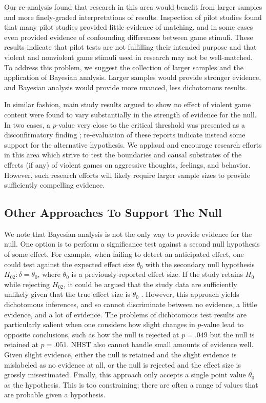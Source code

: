 \documentclass[man]{apa6}
\begin{document}
Our re-analysis found that research in this area would benefit from larger samples and more finely-graded interpretations of results. Inspection of pilot studies found that many pilot studies provided little evidence of matching, and in some cases even provided evidence of confounding differences between game stimuli. These results indicate that pilot tests are not fulfilling their intended purpose and that violent and nonviolent game stimuli used in research may not be well-matched. To address this problem, we suggest the collection of larger samples and the application of Bayesian analysis. Larger samples would provide stronger evidence, and Bayesian analysis would provide more nuanced, less dichotomous results.

In similar fashion, main study results argued to show no effect of violent game content were found to vary substantially in the strength of evidence for the null. In two cases, a $p$-value very close to the critical threshold was presented as a disconfirmatory finding \citep{Elson:etal:2013,Valadez:Ferguson:2012}; re-evaluation of these reports indicate instead some support for the alternative hypothesis. We applaud and encourage research efforts in this area which strive to test the boundaries and causal substrates of the effects (if any) of violent games on aggressive thoughts, feelings, and behavior. However, such research efforts will likely require larger sample sizes to provide sufficiently compelling evidence. 

\subsection{Other Approaches To Support The Null}
We note that Bayesian analysis is not the only way to provide evidence for the null.  One option is to perform a significance test against a second null hypothesis of some effect. For example, when failing to detect an anticipated effect, one could test against the expected effect size $\theta_0$ with the secondary null hypothesis $H_{02}: \delta = \theta_0$, where $\theta_0$ is a previously-reported effect size. If the study retains $H_0$ while rejecting $H_{02}$, it could be argued that the study data are sufficiently unlikely given that the true effect size is $\theta_0$ \citep[e.g.,][]{Simonsohn:etal:2014}. 
However, this approach yields dichotomous inferences, and so cannot discriminate between no evidence, a little evidence, and a lot of evidence. The problems of dichotomous test results are particularly salient when one considers how slight changes in $p$-value lead to opposite conclusions, such as how the null is rejected at $p = .049$ but the null is retained at $p = .051$. NHST also cannot handle small amounts of evidence well. Given slight evidence, either the null is retained and the slight evidence is mislabeled as no evidence at all, or the null is rejected and the effect size is grossly misestimated. Finally, this approach only accepts a single point value $\theta_0$ as the hypothesis. This is too constraining; there are often a range of values that are probable given a hypothesis. 
\end{document}
